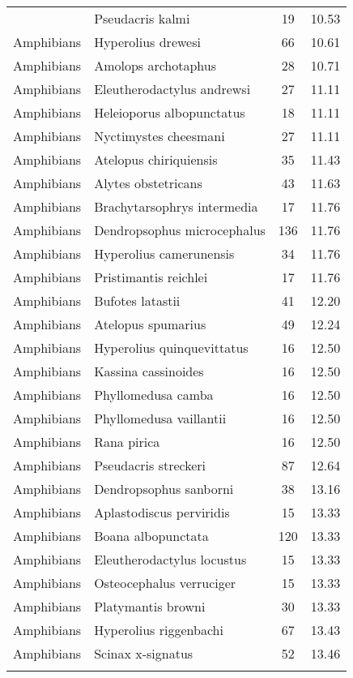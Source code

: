 \begin{longtable}{llcc}
{  Amphibians & Pseudacris kalmi &  19 & 10.53 \\ 
  Amphibians & Hyperolius drewesi &  66 & 10.61 \\ 
  Amphibians & Amolops archotaphus &  28 & 10.71 \\ 
  Amphibians & Eleutherodactylus andrewsi &  27 & 11.11 \\ 
  Amphibians & Heleioporus albopunctatus &  18 & 11.11 \\ 
  Amphibians & Nyctimystes cheesmani &  27 & 11.11 \\ 
  Amphibians & Atelopus chiriquiensis &  35 & 11.43 \\ 
  Amphibians & Alytes obstetricans &  43 & 11.63 \\ 
  Amphibians & Brachytarsophrys intermedia &  17 & 11.76 \\ 
  Amphibians & Dendropsophus microcephalus & 136 & 11.76 \\ 
  Amphibians & Hyperolius camerunensis &  34 & 11.76 \\ 
  Amphibians & Pristimantis reichlei &  17 & 11.76 \\ 
  Amphibians & Bufotes latastii &  41 & 12.20 \\ 
  Amphibians & Atelopus spumarius &  49 & 12.24 \\ 
  Amphibians & Hyperolius quinquevittatus &  16 & 12.50 \\ 
  Amphibians & Kassina cassinoides &  16 & 12.50 \\ 
  Amphibians & Phyllomedusa camba &  16 & 12.50 \\ 
  Amphibians & Phyllomedusa vaillantii &  16 & 12.50 \\ 
  Amphibians & Rana pirica &  16 & 12.50 \\ 
  Amphibians & Pseudacris streckeri &  87 & 12.64 \\ 
  Amphibians & Dendropsophus sanborni &  38 & 13.16 \\ 
  Amphibians & Aplastodiscus perviridis &  15 & 13.33 \\ 
  Amphibians & Boana albopunctata & 120 & 13.33 \\ 
  Amphibians & Eleutherodactylus locustus &  15 & 13.33 \\ 
  Amphibians & Osteocephalus verruciger &  15 & 13.33 \\ 
  Amphibians & Platymantis browni &  30 & 13.33 \\ 
  Amphibians & Hyperolius riggenbachi &  67 & 13.43 \\ 
  Amphibians & Scinax x-signatus &  52 & 13.46 \\ 
}
\end{longtable}

